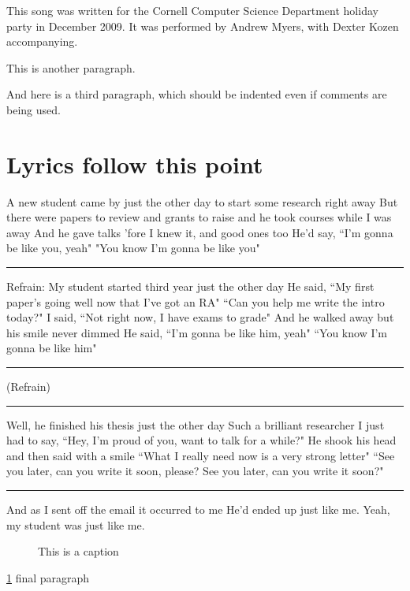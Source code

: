 \documentclass[12pt]{article}
\begin{document}
This song was written for the Cornell Computer Science Department
holiday party in December 2009. It was performed by Andrew Myers,
with Dexter Kozen accompanying.


This is another paragraph.

And here is a third paragraph, which should be indented even if
comments are being used.


\section{Lyrics follow this point}


{
\obeylines
\setlength\parskip{0.7em}
A new student came by just the other day
to start some research right away
But there were papers to review and grants to raise
and he took courses while I was away
And he gave talks 'fore I knew it, and good ones too
He'd say, ``I'm gonna be like you, yeah"
"You know I'm gonna be like you"
\hrule
Refrain:
My student started third year just the other day
He said, ``My first paper's going well now that I've got an RA"
``Can you help me write the intro today?"
I said, ``Not right now, I have exams to grade"
And he walked away but his smile never dimmed
He said, ``I'm gonna be like him, yeah"
``You know I'm gonna be like him"
\hrule
(Refrain)
\hrule
Well, he finished his thesis just the other day
Such a brilliant researcher I just had to say,
``Hey, I'm proud of you, want to talk for a while?"
He shook his head and then said with a smile
``What I really need now is a very strong letter"
``See you later, can you write it soon, please?
See you later, can you write it soon?"
\hrule
And as I sent off the email it occurred to me
He'd ended up just like me.
Yeah, my student was just like me.
}

\begin{figure}


\begin{center}
\end{center}
\caption{This is a caption}
\label{fig}
\end{figure}

\ref{fig}
final paragraph
\end{document}
